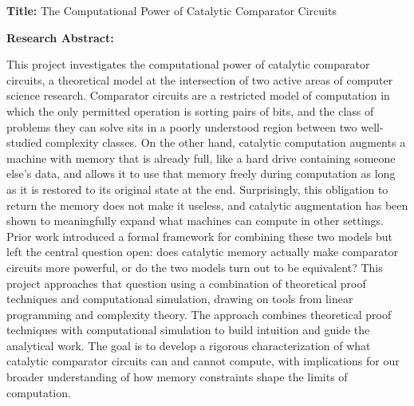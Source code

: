 \documentclass[12pt]{article}
\begin{document}
\textbf{Title:} The Computational Power of Catalytic Comparator Circuits

\textbf{Research Abstract:}

    This project investigates the computational power of catalytic comparator circuits, a theoretical model at the intersection of two active areas of computer science research. Comparator circuits are a restricted model of computation in which the only permitted operation is sorting pairs of bits, and the class of problems they can solve sits in a poorly understood region between two well-studied complexity classes. On the other hand, catalytic computation augments a machine with memory that is already full, like a hard drive containing someone else's data, and allows it to use that memory freely during computation as long as it is restored to its original state at the end. Surprisingly, this obligation to return the memory does not make it useless, and catalytic augmentation has been shown to meaningfully expand what machines can compute in other settings. Prior work introduced a formal framework for combining these two models but left the central question open: does catalytic memory actually make comparator circuits more powerful, or do the two models turn out to be equivalent? This project approaches that question using a combination of theoretical proof techniques and computational simulation, drawing on tools from linear programming and complexity theory. The approach combines theoretical proof techniques with computational simulation to build intuition and guide the analytical work. The goal is to develop a rigorous characterization of what catalytic comparator circuits can and cannot compute, with implications for our broader understanding of how memory constraints shape the limits of computation.
\end{document}
